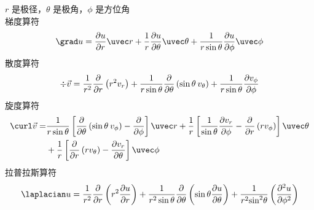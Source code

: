  $r$ 是极径，$\theta $ 是极角，$\phi $ 是方位角\\
 梯度算符
\begin{equation}
\grad u = \frac{{\partial u}}{{\partial r}}\uvec r + \frac{1}{r}\frac{{\partial u}}{{\partial \theta }}\uvec \theta  + \frac{1}{{r\sin \theta }}\frac{{\partial u}}{{\partial \phi }}\uvec \phi
\end{equation}
 散度算符 
\begin{equation}
\div \vec v = \frac{1}{{{r^2}}}\frac{\partial }{{\partial r}}\left( {{r^2}{v_r}} \right) + \frac{1}{{r\sin \theta }}\frac{\partial }{{\partial \theta }}\left( {\sin \theta {\kern 1pt} {\kern 1pt} {v_\theta }} \right) + \frac{1}{{r\sin \theta }}\frac{{\partial {v_\phi }}}{{\partial \phi }}
\end{equation}
 旋度算符
\begin{equation}
\begin{aligned}
\curl \vec v = & \frac{1}{{r\sin \theta }}\left[ {\frac{\partial }{{\partial \theta }}\left( {\sin \theta {\kern 1pt} {\kern 1pt} {v_\phi }} \right) - \frac{\partial }{{\partial \phi }}} \right]\uvec r  + \frac{1}{r}\left[ {\frac{1}{{\sin \theta }}\frac{{\partial {v_r}}}{{\partial \phi }} - \frac{\partial }{{\partial r}}\left( {r{v_\phi }} \right)} \right]\uvec \theta   \\
&+ \frac{1}{r}\left[ {\frac{\partial }{{\partial r}}\left( {r{v_\theta }} \right) - \frac{{\partial {v_r}}}{{\partial \theta }}} \right]\uvec \phi
\end{aligned}
\end{equation}
拉普拉斯算符
\begin{equation}
{\laplacian}u = \frac{1}{{{r^2}}}\frac{\partial }{{\partial r}}\left( {{r^2}\frac{{\partial u}}{{\partial r}}} \right) + \frac{1}{{{r^2}\sin \theta }}\frac{\partial }{{\partial \theta }}\left( {\sin \theta \frac{{\partial u}}{{\partial \theta }}} \right) + \frac{1}{{{r^2}{{\sin }^2}\theta }}\left( {\frac{{{\partial ^2}u}}{{\partial {\phi ^2}}}} \right)
\end{equation}
 